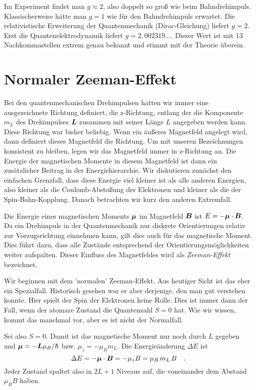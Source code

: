 Im Experiment findet man $g \approx 2$, also doppelt so groß wie beim Bahndrehimpuls. Klassischerweise hätte man $g=1$ wie für den Bahndrehimpuls erwartet. Die relativistische Erweiterung der Quantenmechanik (Dirac-Gleichung) liefert $g=2$. Erst die Quantenelektrodynamik liefert $g=2,002319\dots$. Dieser Wert ist mit 13 Nachkommastellen extrem genau bekannt und stimmt mit der Theorie überein.


\section{Normaler Zeeman-Effekt}

Bei den quantenmechanischen Drehimpulsen hatten wir immer eine ausgezeichnete Richtung definiert, die z-Richtung, entlang der die Komponente $m_L$ des Drehimpulses $\boldsymbol{L}$ zusammen mit seiner Länge $L$ angegeben werden kann. Diese Richtung war bisher beliebig. Wenn ein äußeres Magnetfeld angelegt wird, dann definiert dieses Magnetfeld die Richtung. Um mit unseren Bezeichnungen konsistent zu bleiben, legen wir das Magnetfeld immer in z-Richtung an. Die Energie der magnetischen Momente in diesem Magnetfeld ist dann ein zusätzlicher Beitrag in der Energiehierarchie. Wir diskutieren zunächst den einfachen Grenzfall, dass diese Energie viel kleiner ist als alle anderen Energien, also kleiner als die Coulomb-Abstoßung  der Elektronen und kleiner als die der Spin-Bahn-Kopplung. Danach betrachten wir kurz den anderen Extremfall.

Die Energie eines magnetischen Moments $\boldsymbol{\mu}$ im Magnetfeld $\boldsymbol{B}$ ist $E = - \boldsymbol{\mu} \cdot \boldsymbol{B}$. Da ein Drehimpuls in der Quantenmechanik nur diskrete Orientierungen relativ zur Vorzugsrichtung einnehmen kann, gilt dies auch für das magnetische Moment. Dies führt dazu, dass alle Zustände entsprechend der Orientierungsmöglichkeiten weiter aufspalten. Dieser Einfluss des Magnetfeldes wird als \emph{Zeeman-Effekt} bezeichnet. 

Wir beginnen mit dem 'normalen' Zeeman-Effekt. Aus heutiger Sicht ist das eher ein Spezialfall. Historisch gesehen war er aber derjenige, den man gut verstehen konnte. Hier spielt der Spin der Elektronen keine Rolle. Dies ist immer dann der Fall, wenn der atomare Zustand die Quantenzahl $S=0$ hat. Wie wir wissen, kommt das manchmal vor, aber es ist nicht der Normalfall.

Sei also $S=0$. Damit ist das magnetische Moment nur noch durch $L$ gegeben und $\boldsymbol{\mu} = - \boldsymbol{L} \mu_B / \hbar$ bzw. $\mu_z = - \mu_B  m_L$. Die Energieänderung $\Delta E$ ist
\begin{equation}
    \Delta E = - \boldsymbol{\mu} \cdot \boldsymbol{B} =- \mu_z B =  \mu_B \, m_L \, B  \quad .
\end{equation}
Jeder Zustand spaltet also in $2L + 1$ Niveaus auf, die voneinander dem Abstand $\mu_B B$ haben.

